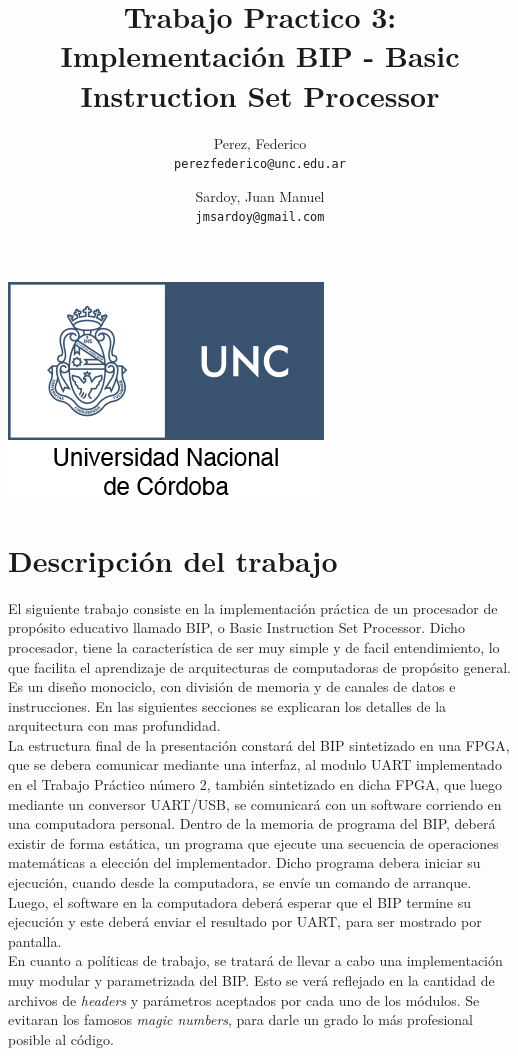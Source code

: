 \documentclass{article}
\title{Trabajo Practico 3: Implementación BIP - Basic Instruction Set Processor}
\author{Perez, Federico\\
        \texttt{perezfederico@unc.edu.ar}
        \and
        Sardoy, Juan Manuel\\
        \texttt{jmsardoy@gmail.com}
        }
\begin{document}
\maketitle
\begin{center}
    \includegraphics[scale=2]{unc-logo}
\end{center}
\newpage
\section{Descripción del trabajo}

\indent El siguiente trabajo consiste en la implementación práctica de un procesador de propósito educativo
llamado BIP, o Basic Instruction Set Processor. Dicho procesador, tiene la característica de ser muy simple
y de facil entendimiento, lo que facilita el aprendizaje de arquitecturas de computadoras de propósito general. \\
\indent Es un diseño monociclo, con división de memoria y de canales de datos e instrucciones. En las siguientes secciones se explicaran los detalles de la arquitectura con mas profundidad. \\
\indent La estructura final de la presentación constará del BIP sintetizado en una FPGA, que se debera comunicar
mediante una interfaz, al modulo UART implementado en el Trabajo Práctico número 2, también sintetizado en dicha FPGA,
que luego mediante un conversor UART/USB, se comunicará con un software corriendo en una computadora personal.
Dentro de la memoria de programa del BIP, deberá existir de forma estática, un programa que ejecute una secuencia de
operaciones matemáticas a elección del implementador. Dicho programa debera iniciar su ejecución, cuando desde la computadora,  se envíe un comando de arranque. Luego, el software en la computadora deberá esperar que el BIP
termine su ejecución y este deberá enviar el resultado por UART, para ser mostrado por pantalla. \\

\indent En cuanto a políticas de trabajo, se tratará de llevar a cabo una implementación muy modular y parametrizada del BIP. Esto se verá reflejado en la cantidad de archivos de \textit{headers} y parámetros aceptados por cada uno de los módulos. Se evitaran los famosos \textit{magic numbers}, para darle un grado lo más profesional posible al código. \\
\newpage
\end{document}
